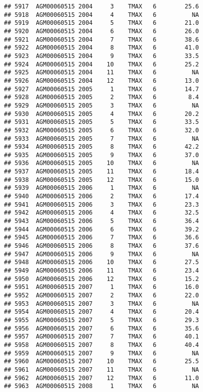 \documentclass{article}\usepackage[]{graphicx}\usepackage[]{color}
\makeatletter
\newenvironment{kframe}{%
 \def\at@end@of@kframe{}%
 \ifinner\ifhmode%
  \def\at@end@of@kframe{\end{minipage}}%
  \begin{minipage}{\columnwidth}%
 \fi\fi%
 \def\FrameCommand##1{\hskip\@totalleftmargin \hskip-\fboxsep
 \colorbox{shadecolor}{##1}\hskip-\fboxsep
     \hskip-\linewidth \hskip-\@totalleftmargin \hskip\columnwidth}%
 \MakeFramed {\advance\hsize-\width
   \@totalleftmargin\z@ \linewidth\hsize
   \@setminipage}}%
 {\par\unskip\endMakeFramed%
 \at@end@of@kframe}
\newenvironment{knitrout}{}{} %
\makeatother
\begin{document}
\begin{knitrout}
\begin{kframe}
\begin{verbatim}
## 5917  AGM00060515 2004     3    TMAX   6        25.6
## 5918  AGM00060515 2004     4    TMAX   6          NA
## 5919  AGM00060515 2004     5    TMAX   6        21.0
## 5920  AGM00060515 2004     6    TMAX   6        26.0
## 5921  AGM00060515 2004     7    TMAX   6        38.6
## 5922  AGM00060515 2004     8    TMAX   6        41.0
## 5923  AGM00060515 2004     9    TMAX   6        33.5
## 5924  AGM00060515 2004    10    TMAX   6        25.2
## 5925  AGM00060515 2004    11    TMAX   6          NA
## 5926  AGM00060515 2004    12    TMAX   6        13.0
## 5927  AGM00060515 2005     1    TMAX   6        14.7
## 5928  AGM00060515 2005     2    TMAX   6         8.4
## 5929  AGM00060515 2005     3    TMAX   6          NA
## 5930  AGM00060515 2005     4    TMAX   6        20.2
## 5931  AGM00060515 2005     5    TMAX   6        33.5
## 5932  AGM00060515 2005     6    TMAX   6        32.0
## 5933  AGM00060515 2005     7    TMAX   6          NA
## 5934  AGM00060515 2005     8    TMAX   6        42.2
## 5935  AGM00060515 2005     9    TMAX   6        37.0
## 5936  AGM00060515 2005    10    TMAX   6          NA
## 5937  AGM00060515 2005    11    TMAX   6        18.4
## 5938  AGM00060515 2005    12    TMAX   6        15.0
## 5939  AGM00060515 2006     1    TMAX   6          NA
## 5940  AGM00060515 2006     2    TMAX   6        17.4
## 5941  AGM00060515 2006     3    TMAX   6        23.3
## 5942  AGM00060515 2006     4    TMAX   6        32.5
## 5943  AGM00060515 2006     5    TMAX   6        36.4
## 5944  AGM00060515 2006     6    TMAX   6        39.2
## 5945  AGM00060515 2006     7    TMAX   6        36.6
## 5946  AGM00060515 2006     8    TMAX   6        37.6
## 5947  AGM00060515 2006     9    TMAX   6          NA
## 5948  AGM00060515 2006    10    TMAX   6        27.5
## 5949  AGM00060515 2006    11    TMAX   6        23.4
## 5950  AGM00060515 2006    12    TMAX   6        15.2
## 5951  AGM00060515 2007     1    TMAX   6        16.0
## 5952  AGM00060515 2007     2    TMAX   6        22.0
## 5953  AGM00060515 2007     3    TMAX   6          NA
## 5954  AGM00060515 2007     4    TMAX   6        20.4
## 5955  AGM00060515 2007     5    TMAX   6        29.3
## 5956  AGM00060515 2007     6    TMAX   6        35.6
## 5957  AGM00060515 2007     7    TMAX   6        40.1
## 5958  AGM00060515 2007     8    TMAX   6        40.4
## 5959  AGM00060515 2007     9    TMAX   6          NA
## 5960  AGM00060515 2007    10    TMAX   6        25.5
## 5961  AGM00060515 2007    11    TMAX   6          NA
## 5962  AGM00060515 2007    12    TMAX   6        11.0
## 5963  AGM00060515 2008     1    TMAX   6          NA

\end{verbatim}
\end{kframe}
\end{knitrout}
\end{document}
